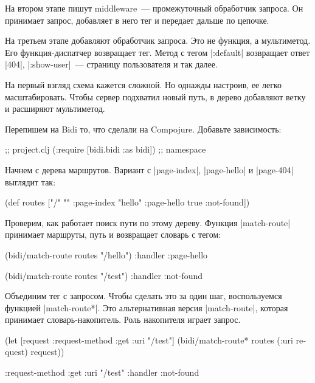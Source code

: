 На втором этапе пишут middleware~--- промежуточный обработчик запроса. Он
принимает запрос, добавляет в него тег и передает дальше по цепочке.

На третьем этапе добавляют обработчик запроса. Это не функция, а мультиметод.
Его функция-диспатчер возвращает тег. Метод с тегом \spverb|:default| возвращает
ответ \spverb|404|, \spverb|:show-user|~--- страницу пользователя и так далее.

На первый взгляд схема кажется сложной. Но однажды настроив, ее легко
масштабировать. Чтобы сервер подхватил новый путь, в дерево добавляют ветку и
расширяют мультиметод.

Перепишем на Bidi то, что сделали на Compojure. Добавьте зависимость:

\begin{english}
  \begin{clojure}
[bidi "2.1.5"]                  ;; project.clj
(:require [bidi.bidi :as bidi]) ;; namespace
  \end{clojure}
\end{english}

Начнем с дерева маршрутов. Вариант с \spverb|page-index|, \spverb|page-hello| и
\spverb|page-404| выглядит так:

\begin{english}
  \begin{clojure}
(def routes
  ["/" {""      :page-index
        "hello" :page-hello
        true    :not-found}])
  \end{clojure}
\end{english}

Проверим, как работает поиск пути по этому дереву. Функция \spverb|match-route|
принимает маршруты, путь и возвращает словарь с тегом:

\begin{english}
  \begin{clojure}
(bidi/match-route routes "/hello")
{:handler :page-hello}

(bidi/match-route routes "/test")
{:handler :not-found}
  \end{clojure}
\end{english}

Объединим тег с запросом. Чтобы сделать это за один шаг, воспользуемся функцией
\spverb|match-route*|. Это альтернативная версия \spverb|match-route|, которая
принимает словарь-накопитель. Роль накопителя играет запрос.

\begin{english}
  \begin{clojure}
(let [request {:request-method :get
               :uri "/test"}]
  (bidi/match-route* routes (:uri request) request))

{:request-method :get
 :uri "/test"
 :handler :not-found}
  \end{clojure}
\end{english}

